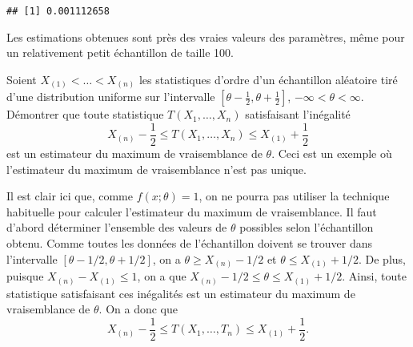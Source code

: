 \begin{exercice}
\begin{sol}
\begin{enumerate}
\begin{knitrout}
\begin{kframe}
\begin{verbatim}
\end{verbatim}
\begin{alltt}
 \hlopt{/}  \hlopt{-} 
\end{alltt}
\begin{verbatim}
## [1] 0.001112658
\end{verbatim}
\end{kframe}
\end{knitrout}
      Les estimations obtenues sont près des vraies valeurs des
      paramètres, même pour un relativement petit échantillon de
      taille 100.
    \end{enumerate}
  \end{sol}
\end{exercice}

\begin{exercice}
  Soient $X_{(1)} < \dots < X_{(n)}$ les statistiques d'ordre d'un
  échantillon aléatoire tiré d'une distribution uniforme sur
  l'intervalle $[\theta - \frac{1}{2}, \theta + \frac{1}{2}]$,
  $-\infty < \theta < \infty$. Démontrer que toute statistique $T(X_1,
  \dots, X_n)$ satisfaisant l'inégalité
  \begin{displaymath}
    X_{(n)} - \frac{1}{2} \leq T(X_1, \dots, X_n) \leq
    X_{(1)} + \frac{1}{2}
  \end{displaymath}
  est un estimateur du maximum de vraisemblance de $\theta$. Ceci est
  un exemple où l'estimateur du maximum de
  vraisemblance n'est pas unique.
  \begin{sol}
    Il est clair ici que, comme $f(x;\theta) = 1$, on ne pourra pas
    utiliser la technique habituelle pour calculer l'estimateur du
    maximum de vraisemblance. Il faut d'abord déterminer l'ensemble
    des valeurs de $\theta$ possibles selon l'échantillon obtenu.
    Comme toutes les données de l'échantillon doivent se trouver dans
    l'intervalle $[\theta - 1/2, \theta + 1/2]$, on a $\theta \geq
    X_{(n)} - 1/2$ et $\theta \leq X_{(1)} + 1/2$. De plus, puisque
    $X_{(n)} - X_{(1)} \leq 1$, on a que $X_{(n)} - 1/2 \leq \theta
    \leq X_{(1)} + 1/2$. Ainsi, toute statistique satisfaisant ces
    inégalités est un estimateur du maximum de vraisemblance de
    $\theta$. On a donc que
    \begin{displaymath}
      X_{(n)} - \frac{1}{2} \leq T(X_1, \dots, T_n) \leq X_{(1)} + \frac{1}{2}.
    \end{displaymath}
  \end{sol}
\end{exercice}


